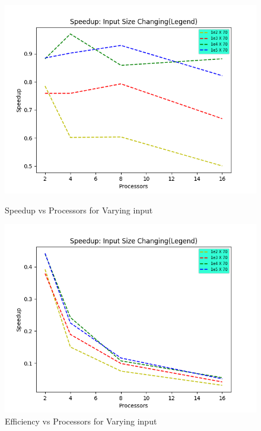 \documentclass{article}
\newcommand{\bld}[1]{\textbf{#1}}
\newcommand{\italb}[1]{\textbf{\textit{{#1}}}}
\begin{document}
\begin{figure}[h]
\vspace*{-2cm}
\centering
\includegraphics[scale=0.9]{Part2S.png}
\caption{Speedup vs Processors for Varying input}
\includegraphics[scale=0.9]{Part2E.png}
\caption{Efficiency vs Processors for Varying input}
\end{figure}
\end{document}

